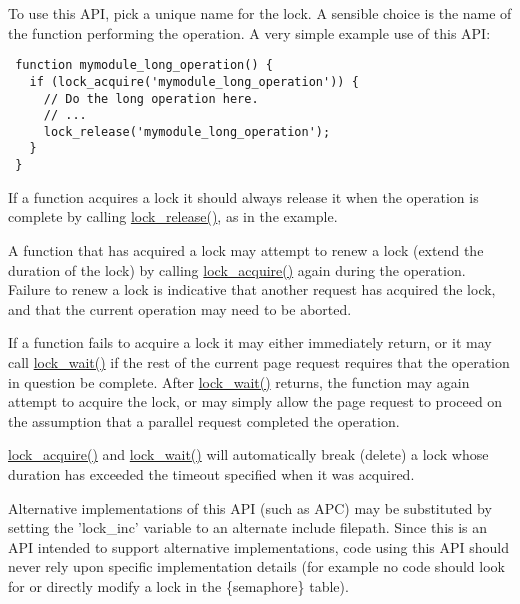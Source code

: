 To use this API, pick a unique name for the lock. A sensible choice is the name of the function performing the operation. A very simple example use of this API: 

\begin{Code}\begin{verbatim} function mymodule_long_operation() {
   if (lock_acquire('mymodule_long_operation')) {
     // Do the long operation here.
     // ...
     lock_release('mymodule_long_operation');
   }
 }
\end{verbatim}
\end{Code}



If a function acquires a lock it should always release it when the operation is complete by calling \hyperlink{group__lock_g73e1456861f9aff1a506a650f43aceb0}{lock\_\-release()}, as in the example.

A function that has acquired a lock may attempt to renew a lock (extend the duration of the lock) by calling \hyperlink{group__lock_gc67a4b1061491f7a869646f47b66e998}{lock\_\-acquire()} again during the operation. Failure to renew a lock is indicative that another request has acquired the lock, and that the current operation may need to be aborted.

If a function fails to acquire a lock it may either immediately return, or it may call \hyperlink{group__lock_g54c2ee771edac47614b8f12d949d3376}{lock\_\-wait()} if the rest of the current page request requires that the operation in question be complete. After \hyperlink{group__lock_g54c2ee771edac47614b8f12d949d3376}{lock\_\-wait()} returns, the function may again attempt to acquire the lock, or may simply allow the page request to proceed on the assumption that a parallel request completed the operation.

\hyperlink{group__lock_gc67a4b1061491f7a869646f47b66e998}{lock\_\-acquire()} and \hyperlink{group__lock_g54c2ee771edac47614b8f12d949d3376}{lock\_\-wait()} will automatically break (delete) a lock whose duration has exceeded the timeout specified when it was acquired.

Alternative implementations of this API (such as APC) may be substituted by setting the 'lock\_\-inc' variable to an alternate include filepath. Since this is an API intended to support alternative implementations, code using this API should never rely upon specific implementation details (for example no code should look for or directly modify a lock in the \{semaphore\} table). 

